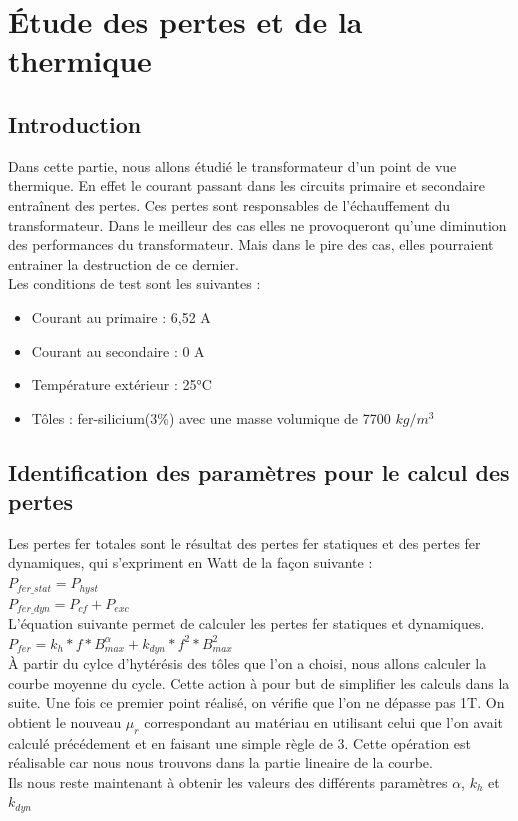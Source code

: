 
\section{Étude des pertes et de la thermique}

\subsection{Introduction}

	Dans cette partie, nous allons étudié le transformateur d'un point de vue thermique. En effet le courant passant dans les circuits primaire et secondaire entraînent des pertes. Ces pertes sont responsables de l'échauffement du transformateur. Dans le meilleur des cas elles ne provoqueront qu'une diminution des performances du transformateur. Mais dans le pire des cas, elles pourraient entrainer la destruction de ce dernier. \\
	Les conditions de test sont les suivantes : 
\begin{itemize}
\item Courant au primaire : 6,52 A
\item Courant au secondaire  : 0 A
\item Température extérieur :  25°C
\item Tôles : fer-silicium(3\%) avec une masse volumique de 7700 $kg/m^3$
\end{itemize}


\subsection{Identification des paramètres pour le calcul des pertes}

Les pertes fer totales sont le résultat des pertes fer statiques et des pertes fer dynamiques, qui s'expriment en Watt de la façon suivante :\\
		$ P_{fer\_stat} = P_{hyst}$\\
		$ P_{fer\_dyn} = P_{cf} + P_{exc}$\\

L'équation suivante permet de calculer les pertes fer statiques et dynamiques.\\
$ P_{fer} = k_h*f*B_{max}^{\alpha} + k_{dyn}*f^2*B_{max}^2$\\
  

	À partir du cylce d'hytérésis des tôles que l'on a choisi, nous allons calculer la courbe moyenne du cycle. Cette action à pour but de simplifier les calculs dans la suite. Une fois ce premier point réalisé, on vérifie que l'on ne dépasse pas 1T. On obtient le nouveau $\mu_r$ correspondant au matériau en utilisant celui que l'on avait calculé précédement et en faisant une simple règle de 3. Cette opération est réalisable car nous nous trouvons dans la partie lineaire de la courbe.\\
Ils nous reste maintenant à obtenir les valeurs des différents paramètres  $\alpha$, $k_h$ et $k_{dyn}$\\

